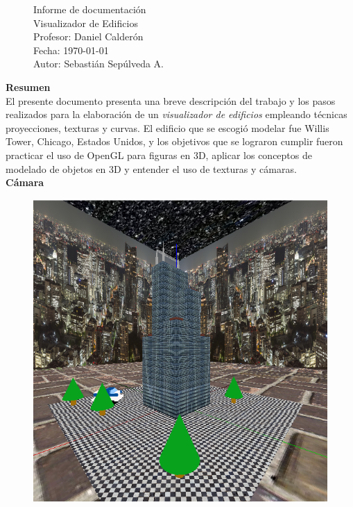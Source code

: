 \documentclass[letterpaper,11pt]{article}
\begin{document}
\pagestyle{style2}
\begin{figure}
\centering
\begin{minipage}[c]{0.8\textwidth}
\centering
\vspace{0.3cm}
{\large Informe de documentación}\\
{\Large Visualizador de Edificios}
\vspace{0.3cm}\\
Profesor: Daniel Calderón\\
Fecha: \today\\
Autor: Sebastián Sepúlveda A.
\end{minipage}
\end{figure}

{\centering \textbf{{\Large Resumen}}}\\

El presente documento presenta una breve descripción del trabajo y los pasos realizados para la elaboración de un \textit{visualizador de edificios} empleando técnicas proyecciones, texturas y curvas. El edificio que se escogió modelar fue Willis Tower, Chicago, Estados Unidos, y los objetivos que se lograron cumplir fueron practicar el uso de OpenGL para figuras en 3D, aplicar los conceptos de modelado de objetos en 3D y entender el uso de texturas y cámaras.\\

{\centering \textbf{{\Large Cámara}}}\\

\begin{figure}
  \centering
  \includegraphics[scale=0.45]{images/tarea2/vista_periferica_tower.png}
  \label{fig: vista_inicial}
\end{figure}
\end{document}
